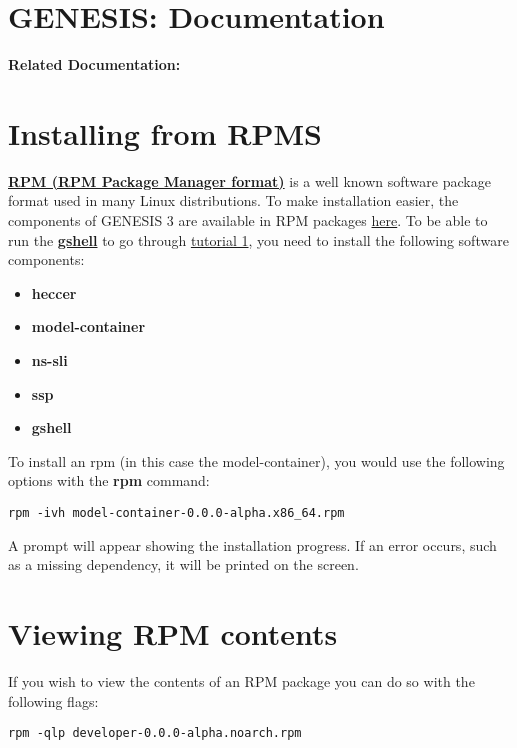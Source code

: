 \documentclass[12pt]{article}
\begin{document}
\section*{GENESIS: Documentation}

{\bf Related Documentation:}

\section*{Installing from RPMS}

\href{http://rpm.org}{\bf RPM (RPM Package Manager format)} is a well known software package format used in many Linux distributions. To make installation easier, the components of GENESIS 3 are available in RPM packages \href{http://repo-genesis3.cbi.utsa.edu/rpm/}{here}. To be able to run the \href{../gshell/gshell.tex}{\bf gshell} to go through \href{../tutorial1/tutorial1.tex}{tutorial 1}, you need to install the following software components:

\begin{itemize}
	\item[] {\bf heccer}
	\item[] {\bf model-container}
	\item[] {\bf ns-sli}
	\item[] {\bf ssp}
	\item[] {\bf gshell}
\end{itemize}

To install an rpm (in this case the model-container), you would use the following options with the {\bf rpm} command:

\begin{verbatim}
rpm -ivh model-container-0.0.0-alpha.x86_64.rpm
\end{verbatim}

A prompt will appear showing the installation progress. If an error occurs, such as a missing dependency, it will be printed on the screen. 


\section*{Viewing RPM contents}

If you wish to view the contents of an RPM package you can do so with the following flags:

\begin{verbatim}
rpm -qlp developer-0.0.0-alpha.noarch.rpm
\end{verbatim}
\end{document}
